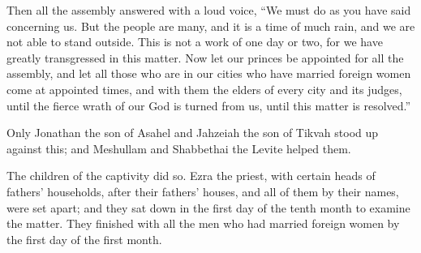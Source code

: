  Then all the assembly answered with a loud voice, ``We
must do as you have said concerning us.  But the people
are many, and it is a time of much rain, and we are not able to stand
outside. This is not a work of one day or two, for we have greatly
transgressed in this matter.  Now let our princes be
appointed for all the assembly, and let all those who are in our cities
who have married foreign women come at appointed times, and with them
the elders of every city and its judges, until the fierce wrath of our
God is turned from us, until this matter is resolved.''

 Only Jonathan the son of Asahel and Jahzeiah the son of
Tikvah stood up against this; and Meshullam and Shabbethai the Levite
helped them.

 The children of the captivity did so. Ezra the priest,
with certain heads of fathers' households, after their fathers' houses,
and all of them by their names, were set apart; and they sat down in the
first day of the tenth month to examine the matter.  They
finished with all the men who had married foreign women by the first day
of the first month.

